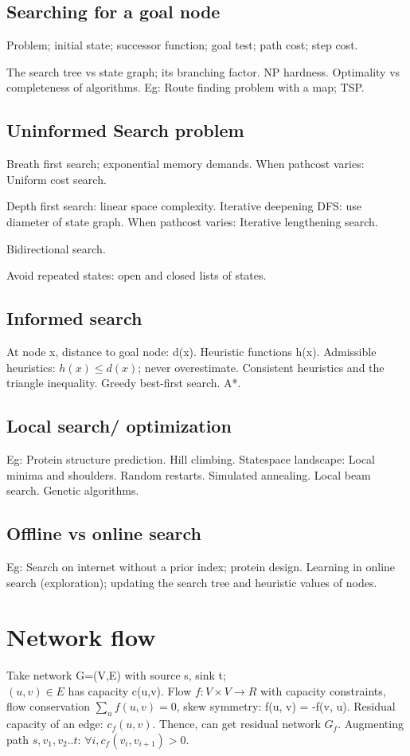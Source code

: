 \documentclass[oneside, article]{memoir}
\begin{document}
\section{Searching for a goal node}
Problem; initial state; successor function; goal test; path cost; step cost.

The search tree vs state graph; its branching factor. NP hardness. Optimality vs completeness of algorithms. Eg: Route finding problem with a map; TSP.

\section{Uninformed Search problem}
Breath first search; exponential memory demands. When pathcost varies: Uniform cost search.

Depth first search: linear space complexity. Iterative deepening DFS: use diameter of state graph. When pathcost varies: Iterative lengthening search.

Bidirectional search.

Avoid repeated states: open and closed lists of states.

\section{Informed search}
At node x, distance to goal node: d(x). Heuristic functions h(x). Admissible heuristics: $h(x) \leq d(x)$; never overestimate. Consistent heuristics and the triangle inequality. Greedy best-first search. A*.

\section{Local search/ optimization}
Eg: Protein structure prediction. Hill climbing. Statespace landscape: Local minima and shoulders. Random restarts. Simulated annealing. Local beam search. Genetic algorithms.

\section{Offline vs online search}
Eg: Search on internet without a prior index; protein design. Learning in online search (exploration); updating the search tree and heuristic values of nodes.


\chapter{Network flow}
Take network G=(V,E) with source s, sink t; \\
$(u,v) \in E$ has capacity c(u,v). Flow $f:V\times V \to R$ with capacity constraints, flow conservation $\sum_{u} f(u, v) = 0$, skew symmetry: f(u, v) = -f(v, u). Residual capacity of an edge: $c_{f}(u, v)$. Thence, can get residual network $G_{f}$. Augmenting path $s, v_{1}, v_{2} .. t$: $\forall i, c_{f}(v_{i}, v_{i+1})>0$.
\end{document}
